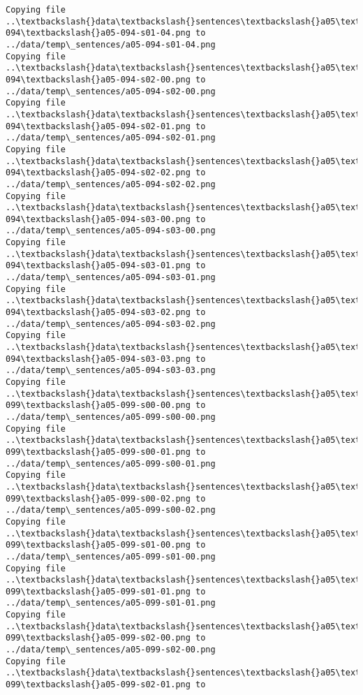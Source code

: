 \documentclass[11pt]{article}
\begin{document}
\begin{Verbatim}[commandchars=\\\{\}]
Copying file ..\textbackslash{}data\textbackslash{}sentences\textbackslash{}a05\textbackslash{}a05-094\textbackslash{}a05-094-s01-04.png to
../data/temp\_sentences/a05-094-s01-04.png
Copying file ..\textbackslash{}data\textbackslash{}sentences\textbackslash{}a05\textbackslash{}a05-094\textbackslash{}a05-094-s02-00.png to
../data/temp\_sentences/a05-094-s02-00.png
Copying file ..\textbackslash{}data\textbackslash{}sentences\textbackslash{}a05\textbackslash{}a05-094\textbackslash{}a05-094-s02-01.png to
../data/temp\_sentences/a05-094-s02-01.png
Copying file ..\textbackslash{}data\textbackslash{}sentences\textbackslash{}a05\textbackslash{}a05-094\textbackslash{}a05-094-s02-02.png to
../data/temp\_sentences/a05-094-s02-02.png
Copying file ..\textbackslash{}data\textbackslash{}sentences\textbackslash{}a05\textbackslash{}a05-094\textbackslash{}a05-094-s03-00.png to
../data/temp\_sentences/a05-094-s03-00.png
Copying file ..\textbackslash{}data\textbackslash{}sentences\textbackslash{}a05\textbackslash{}a05-094\textbackslash{}a05-094-s03-01.png to
../data/temp\_sentences/a05-094-s03-01.png
Copying file ..\textbackslash{}data\textbackslash{}sentences\textbackslash{}a05\textbackslash{}a05-094\textbackslash{}a05-094-s03-02.png to
../data/temp\_sentences/a05-094-s03-02.png
Copying file ..\textbackslash{}data\textbackslash{}sentences\textbackslash{}a05\textbackslash{}a05-094\textbackslash{}a05-094-s03-03.png to
../data/temp\_sentences/a05-094-s03-03.png
Copying file ..\textbackslash{}data\textbackslash{}sentences\textbackslash{}a05\textbackslash{}a05-099\textbackslash{}a05-099-s00-00.png to
../data/temp\_sentences/a05-099-s00-00.png
Copying file ..\textbackslash{}data\textbackslash{}sentences\textbackslash{}a05\textbackslash{}a05-099\textbackslash{}a05-099-s00-01.png to
../data/temp\_sentences/a05-099-s00-01.png
Copying file ..\textbackslash{}data\textbackslash{}sentences\textbackslash{}a05\textbackslash{}a05-099\textbackslash{}a05-099-s00-02.png to
../data/temp\_sentences/a05-099-s00-02.png
Copying file ..\textbackslash{}data\textbackslash{}sentences\textbackslash{}a05\textbackslash{}a05-099\textbackslash{}a05-099-s01-00.png to
../data/temp\_sentences/a05-099-s01-00.png
Copying file ..\textbackslash{}data\textbackslash{}sentences\textbackslash{}a05\textbackslash{}a05-099\textbackslash{}a05-099-s01-01.png to
../data/temp\_sentences/a05-099-s01-01.png
Copying file ..\textbackslash{}data\textbackslash{}sentences\textbackslash{}a05\textbackslash{}a05-099\textbackslash{}a05-099-s02-00.png to
../data/temp\_sentences/a05-099-s02-00.png
Copying file ..\textbackslash{}data\textbackslash{}sentences\textbackslash{}a05\textbackslash{}a05-099\textbackslash{}a05-099-s02-01.png to

\end{Verbatim}
\end{document}

